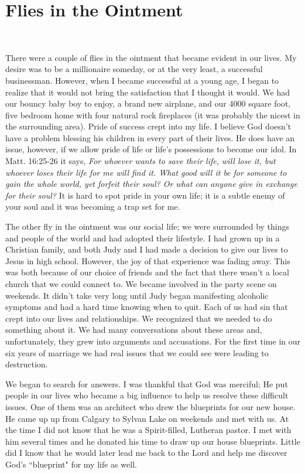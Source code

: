 \documentclass[oneside,12pt]{book}
\begin{document}
\section{Flies in the Ointment}
\

There were a couple of flies in the ointment that became evident in our lives. My desire was to be a millionaire someday, or at the very least, a successful businessman. However, when I became successful at a young age, I began to realize that it would not bring the satisfaction that I thought it would. We had our bouncy baby boy to enjoy, a brand new airplane, and our 4000 square foot, five bedroom home with four natural rock fireplaces (it was probably the nicest in the surrounding area).  Pride of success crept into my life. I believe God doesn't have a problem blessing his children in every part of their lives. He does have an issue, however, if we allow pride of life or life's possessions to become our idol. In Matt. 16:25-26 it says, \textit{For whoever wants to save their life, will lose it, but whoever loses their life for me will find it. What good will it be for someone to gain the whole world, yet forfeit their soul? Or what can anyone give in exchange for their soul?} It is hard to spot pride in your own life; it is a subtle enemy of your soul and it was becoming a trap set for me.

The other fly in the ointment was our social life; we were surrounded by things and people of the world and had adopted their lifestyle. I had grown up in a Christian family, and both Judy and I had made a decision to give our lives to Jesus in high school. However, the joy of that experience was fading away. This was both because of our choice of friends and the fact that there wasn't a local church that we could connect to. We became involved in the party scene on weekends. It didn't take very long until Judy began manifesting alcoholic symptoms and had a hard time knowing when to quit. Each of us had sin that crept into our lives and relationships. We recognized that we needed to do something about it. We had many conversations about these areas and, unfortunately, they grew into arguments and accusations. For the first time in our six years of marriage we had real issues that we could see were leading to destruction.

We began to search for answers. I was thankful that God was merciful; He put people in our lives who became a big influence to help us resolve these difficult issues. One of them was an architect who drew the blueprints for our new house. He came up up from Calgary to Sylvan Lake on weekends and met with us. At the time I did not know that he was a Spirit-filled, Lutheran pastor. I met with him several times and he donated his time to draw up our house blueprints. Little did I know that he would later lead me back to the Lord and help me discover God's ``blueprint" for my life as well.
\end{document}
